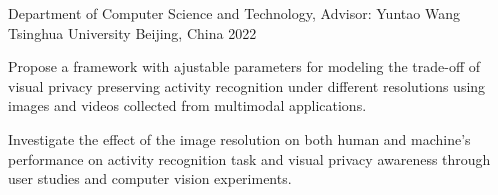 \begin{cventries}
  \cventry
    {Department of Computer Science and Technology, Advisor: Yuntao Wang} %
    {Tsinghua University} %
    {Beijing, China} %
    {2022} %
    {
      \begin{cvitems} %
        \item {Propose a framework with ajustable parameters for modeling the trade-off of visual privacy preserving activity recognition under different resolutions using images and videos collected from multimodal applications.}
        \item {Investigate the effect of the image resolution on both human and machine's performance on activity recognition task and visual privacy awareness through user studies and computer vision experiments.}
      \end{cvitems}
    }

\end{cventries}
